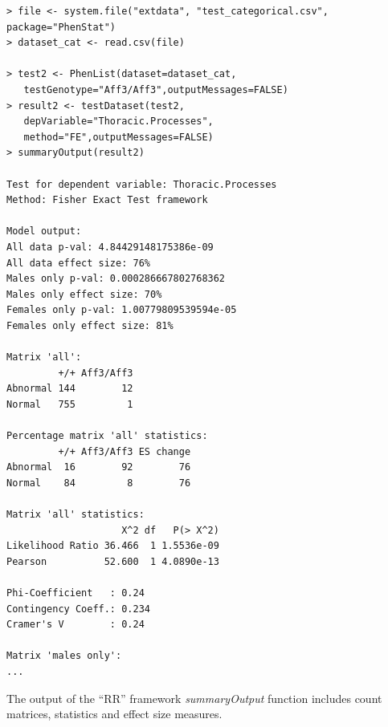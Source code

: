 \documentclass[12pt,a4paper]{article}
\begin{document}
\begingroup
    \fontsize{8pt}{12pt}\selectfont
\begin{verbatim}
> file <- system.file("extdata", "test_categorical.csv", package="PhenStat") 
> dataset_cat <- read.csv(file)

> test2 <- PhenList(dataset=dataset_cat,
   testGenotype="Aff3/Aff3",outputMessages=FALSE)
> result2 <- testDataset(test2,
   depVariable="Thoracic.Processes",
   method="FE",outputMessages=FALSE)  
> summaryOutput(result2)

Test for dependent variable: Thoracic.Processes
Method: Fisher Exact Test framework

Model output:
All data p-val: 4.84429148175386e-09
All data effect size: 76%
Males only p-val: 0.000286667802768362
Males only effect size: 70%
Females only p-val: 1.00779809539594e-05
Females only effect size: 81%

Matrix 'all':
         +/+ Aff3/Aff3
Abnormal 144        12
Normal   755         1

Percentage matrix 'all' statistics:
         +/+ Aff3/Aff3 ES change
Abnormal  16        92        76
Normal    84         8        76

Matrix 'all' statistics:
                    X^2 df   P(> X^2)
Likelihood Ratio 36.466  1 1.5536e-09
Pearson          52.600  1 4.0890e-13

Phi-Coefficient   : 0.24 
Contingency Coeff.: 0.234 
Cramer's V        : 0.24 

Matrix 'males only':
...
\end{verbatim}
\endgroup


The output of the “RR” framework \textit{summaryOutput} function includes count matrices, statistics and effect size measures.
\end{document}
